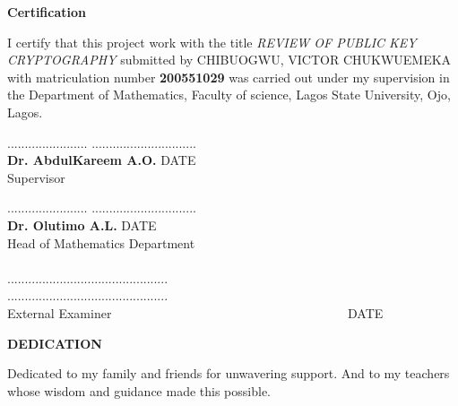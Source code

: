 \documentclass[12pt]{report}
\numberwithin{equation}{chapter}
\begin{document}
\newpage
{}
\begin{flushleft}
	\textbf{\LARGE Certification}
\end{flushleft}
\vspace{1cm}
I certify that this project work with the title \emph{\large REVIEW OF PUBLIC KEY CRYPTOGRAPHY} submitted by CHIBUOGWU, VICTOR CHUKWUEMEKA with matriculation number \textbf{200551029} was carried out under my supervision in the Department of Mathematics, Faculty of science, Lagos State University, Ojo, Lagos.
\\	
\begin{flushleft}
	
	
	\vspace{1.5cm}
	.......................
	\hspace{7cm}
	..............................\\
	\textbf{Dr. AbdulKareem A.O.}\hspace {6.2cm} DATE\\
	Supervisor\\
	
	\vspace{1.5cm}
	
	.......................
	\hspace{7cm}
	..............................\\
	\textbf{Dr. Olutimo A.L.}\hspace{6cm} DATE\\
	Head of Mathematics Department\\
	\vspace{1.5cm}
	\vspace{1.5cm}\\
..............................................\,\,\,\,\,\,\,\,\,\,\,\,\,\,\,\,\,\,\,\,\,\,\,\,\,\,\,\,\,\,\,\,\,\,
\,\,\,\,\,\,\,\,\,\,\,\,\,\,\,\,\,\,\,\,\,\,\,\,\,\,
..............................................\\
External Examiner
\,\,\,\,\,\,\,\,\,\,\,\,\,\,\,\,\,\,\,\,\,\,\,\,\,\,\,\,\,\,\,\,\,\,\,\,\,\,\,\,\,\,\,\,\,\,\,\,\,\,\,
\,\,\,\,\,\,\,\,\,\,\,\,\,\,\,\,\,\,\,\,\,\,\,\,\,\,\,\,\,\,\,\,\,\,\,\,
\,\,\,\,\,\,\,\,\,\,\,\,\,\,\,\,\,\,\,\,DATE
\end{flushleft}

\pagebreak
{}
\begin{center}
    \textbf{DEDICATION}
\end{center}
Dedicated to my family and friends for unwavering support. And to my teachers whose wisdom and guidance made this possible.
\end{document}
